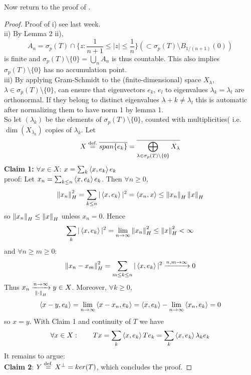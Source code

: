 \documentclass{article}
\begin{document}
Now return to the proof of .  

\begin{proof}
	Proof of i) see last week.\\
	ii) By Lemma 2 ii),
	$$A_n=\sigma_p(T)\cap\{z:\frac{1}{n+1}\leq|z|\leq\frac{1}{n}\}(\subset \sigma_p(T)\setminus B_{1/(n+1)}(0))$$
	is finite and $\sigma_p(T)\setminus\{0\}=\bigcup_n A_n$ is thus countable. This also implies $\sigma_p(T)\setminus\{0\}$ has no accumulation point.\\
	iii) By applying Gram-Schmidt to the (finite-dimensional) space $X_\lambda$, $\lambda\in\sigma_p(T)\setminus\{0\}$, can ensure that eigenvectors $e_k$, $e_l$ to eigenvalues $\lambda_k=\lambda_l$ are orthonormal. If they belong
	to distinct eigenvalues $\lambda+k \neq \lambda_l$ this is automatic after normalizing them to have norm 1 by lemma 1.\\
	So let $(\lambda_k)$ be the elements of $\sigma_p(T)\setminus\{0\}$, counted with multiplicities( i.e. $\dim(X_{\lambda_k})$ copies of $\lambda_k$. Let
	$$
		X\stackrel{\text{def.}}{=}\overline{span\{e_k\}}=\overline{\bigoplus_{\lambda\in\sigma_p(T)\setminus\{0\}}X_\lambda}
	$$
	\textbf{Claim 1:} $\forall x\in X$: $x=\sum_k \left<{x},{e_k}\right>e_k$\\
	proof: Let $x_n=\sum_{k \leq n} \left<{x},{e_k}\right>e_k$.
	Then $\forall n\geq0$,
	$$
	\left\|{x_n}\right\|_H^2=\sum_{k\leq n}|\left<{x},{e_k}\right>|^2=\left<{x_n},{x}\right>\leq\left\|{x_n}\right\|_H\left\|{x}\right\|_H$$
	so $\left\|{x_n}\right\|_H\leq\left\|{x}\right\|_H$ unless $x_n=0$. Hence
	$$\sum_{k}|\left<{x},{e_k}\right>|^2=\lim_{n\to\infty}\left\|{x_n}\right\|_H^2\leq\left\|{x}\right\|_H^2<\infty$$
	and $\forall n\geq m\geq0$:
	$$\left\|{x_n-x_m}\right\|^2_H=\sum_{m\leq k\leq n}|\left<{x},{e_k}\right>|^2\xrightarrow{n,m\to\infty}0$$
	Thus $x_n\xrightarrow[\left\|{\cdot}\right\|_H]{n\to\infty}y\in X$. Moreover, $\forall k\geq 0$,
	$$\left<{x-y},{e_k}\right>=\lim_{n\to\infty}\left<{x-x_n},{e_k}\right>=\left<{x},{e_k}\right>-\lim_{n\to\infty}\left<{x_n},{e_k}\right>=0$$
	so $x=y$. With Claim 1 and continuity of $T$ we have
	$$\forall x\in X: \qquad Tx=\sum_k \left<{x},{e_k}\right>Te_k=\sum_k \left<{x},{e_k}\right>\lambda_ke_k$$
	It remains to argue:\\
	{\bf Claim 2}: $Y\stackrel{\text{def.}}{=} X^\perp=ker(T)$, which concludes the proof.  
 

\end{proof}
\end{document}
